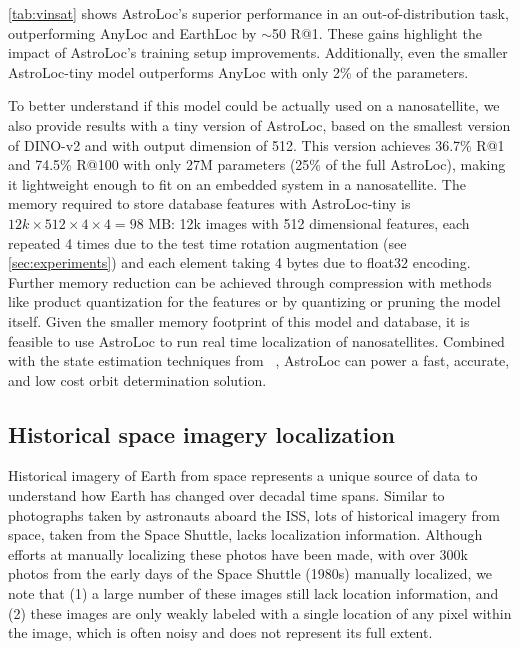  \cref{tab:vinsat} shows AstroLoc's superior performance in an out-of-distribution task, outperforming AnyLoc and EarthLoc by $\sim$50 R@1. These gains highlight the impact of AstroLoc's training setup improvements. Additionally, even the smaller AstroLoc-tiny model outperforms AnyLoc with only 2\% of the parameters.

 To better understand if this model could be actually used on a nanosatellite, we also provide results with a tiny version of AstroLoc, based on the smallest version of DINO-v2 and with output dimension of 512.
This version achieves 36.7\% R@1 and 74.5\% R@100 with only 27M parameters (25\% of the full AstroLoc), making it lightweight enough to fit on an embedded system in a nanosatellite.
The memory required to store database features with AstroLoc-tiny is 
$12k \times 512 \times 4 \times 4 = 98 \text{ MB}$: 12k images with 512 dimensional features, each repeated 4 times due to the test time rotation augmentation (see \cref{sec:experiments}) and each element taking 4 bytes due to float32 encoding.
Further memory reduction can be achieved through compression with methods like product quantization \cite{Jegou_2011_productQ} for the features or by quantizing or pruning the model itself.
Given the smaller memory footprint of this model and database, it is feasible to use AstroLoc to run real time localization of nanosatellites. Combined with the state estimation techniques from ~\cite{McCleary_2024_vinsat}, AstroLoc can power a fast, accurate, and low cost orbit determination solution.


\subsection{Historical space imagery localization}

Historical imagery of Earth from space represents a unique source of data to understand how Earth has changed over decadal time spans.
Similar to photographs taken by astronauts aboard the ISS, lots of historical imagery from space, taken from the Space Shuttle, lacks localization information.
Although efforts at manually localizing these photos have been made, with over 300k photos from the early days of the Space Shuttle (1980s) manually localized, we note that (1) a large number of these images still lack location information, and (2) these images are only weakly labeled with a single location of any pixel within the image, which is often noisy and does not represent its full extent.

